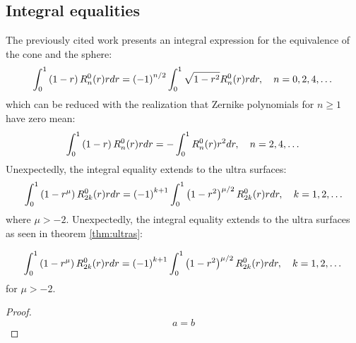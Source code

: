 \documentclass[preprint,12pt]{elsarticle}
\begin{document}
\subsection{Integral equalities}
The previously cited work \cite[eq. 19]{22358} presents an integral expression for the equivalence of the cone and the sphere:
  \begin{equation}
      \int_{0}^{1} \left( 1-r \right) R_{n}^{0}(r) r dr = \left( -1 \right)^{n/2} \int_{0}^{1} \sqrt{ 1 - r^{2} }R_{n}^{0}(r) r dr, \quad n=0,2,4,\dots
  \end{equation}
which can be reduced with the realization \cite[Theorem 1]{TCE} that Zernike polynomials for $n\ge1$ have zero mean:
  \begin{equation}
      \int_{0}^{1} \left( 1-r \right) R_{n}^{0}(r) r dr = - \int_{0}^{1} R_{n}^{0}(r) r^{2} dr, \quad n=2,4,\dots
  \end{equation}
Unexpectedly, the integral equality extends to the ultra surfaces:
\begin{equation}
    \int_{0}^{1} \paren{1-r^{\mu}} R_{2k}^{0}(r) r dr = \paren{-1}^{k+1} \int_{0}^{1} \paren{ 1 - r^{2} }^{\mu/2}R_{2k}^{0}(r) r dr, \quad k=1,2,\dots
    \label{eq:integrals}
\end{equation}
where $\mu > -2$.
Unexpectedly, the integral equality extends to the ultra surfaces as seen in theorem \eqref{thm:ultras}:
{\color{blue}
\begin{myTheorem}  %
  \begin{equation}
    \int_{0}^{1} \paren{1-r^{\mu}} R_{2k}^{0}(r) r dr = \paren{-1}^{k+1} \int_{0}^{1} \paren{ 1 - r^{2} }^{\mu/2}R_{2k}^{0}(r) r dr, \quad k=1,2,\dots
	\end{equation}
for $\mu > -2$.
  \label{thm:ultras}
\end{myTheorem}  %
%
\begin{proof}  %
  \begin{equation*}   %
    a = b
  \end{equation*}
\end{proof}
}
\end{document}

